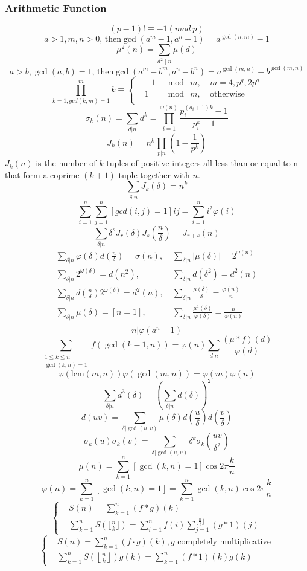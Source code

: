 \begin{footnotesize}
\subsubsection{Arithmetic Function}
\[(p-1)!\equiv-1(mod\ p)\]
\[a>1,m,n>0 \text{, then} \gcd(a^m-1,a^n-1)=a^{\gcd(n,m)}-1\]
\[ \mu^2(n) = \sum_{d^2 \mid n} \mu (d) \]
\[a>b,\gcd(a,b)=1 \text{, then} \gcd(a^m-b^m,a^n-b^n)=a^{\gcd(m,n)}-b^{\gcd(m,n)}\]
\[ \prod_{k=1,gcd(k, m) = 1}^{m} k \equiv \left\{
\begin{aligned}
&-1 & \mod\ m,\ & m = 4, p^q, 2p^q \\
&1 & \mod\ m,\ & \text{otherwise} \\
\end{aligned}
\right.
\]
\[ \sigma_k(n) = \sum_{d|n}d^k = \prod_{i=1}^{\omega(n)}\frac{p_i^{(a_i+1)k}-1}
{p_i^k-1} \]
\[ J_k(n) = n^k\prod_{p|n}(1-\frac{1}{p^k}) \]
$J_k(n)$ is the number of $k$-tuples of positive integers all less than or equal to n that form a coprime $(k + 1)$-tuple together with $n$.
\[ \sum_{\delta|n}J_k(\delta) = n^k \]
\[ \sum_{i=1}^{n} \sum_{j=1}^{n} [gcd(i,j)=1]ij =  \sum_{i=1}^{n} i^2\varphi(i) \]
\[ \sum_{\delta|n}\delta^sJ_r(\delta)J_s(\frac{n}{\delta}) = J_{r+s}(n) \]
\begin{align*}
\sum_{\delta|n}\varphi(\delta)d\left(\frac{n}{\delta}\right) = \sigma(n),&\ \sum_{\delta|n}\left| \mu(\delta) \right| = 2^{\omega(n)} \\
\sum_{\delta|n}2^{\omega(\delta)} = d(n^2),&\ \sum_{\delta|n}d(\delta^2) = d^2(n) \\
\sum_{\delta|n}d\left(\frac{n}{\delta}\right)2^{\omega(\delta)} = d^2(n),&\ \sum_{\delta|n}\frac{\mu(\delta)}{\delta} = \frac{\varphi(n)}{n} \\
\sum_{\delta|n}\mu(\delta) = [n=1],&\ \sum_{\delta|n}\frac{\mu^2(\delta)}{\varphi(\delta)} = \frac{n}{\varphi(n)} \\
\end{align*}
\[ n|\varphi(a^n-1) \]
\[ \sum_{\substack{1 \leq k \leq n \\ \gcd(k, n) = 1}}f(\gcd(k-1, n)) = \varphi(n)
\sum_{d|n}\frac{(\mu*f)(d)}{\varphi(d)} \]
\[ \varphi(\mathrm{lcm}(m, n))\varphi(\gcd(m,n)) = \varphi(m)\varphi(n) \]
\[ \sum_{\delta|n}d^3(\delta) = (\sum_{\delta|n}d(\delta))^2 \]
\[ d(uv) = \sum_{\delta|\gcd(u, v)}\mu(\delta)d(\frac{u}{\delta})d(\frac{v}{\delta}) \]
\[ \sigma_k(u)\sigma_k(v) = \sum_{\delta|\gcd(u, v)}\delta^k\sigma_k(\frac{uv}{\delta^2}) \]
\[ \mu(n) = \sum_{k=1}^n[\gcd(k, n)=1]\cos{2\pi \frac{k}{n}} \]
\[ \varphi(n) = \sum_{k=1}^n[\gcd(k, n)=1] = \sum_{k=1}^n\gcd(k, n)\cos{2\pi \frac{k}{n}} \]
\[
\left\{
\begin{aligned}
&S(n) = \sum_{k=1}^n(f \ast g)(k) \\
&\sum_{k=1}^nS(\lfloor \frac n k \rfloor) = \sum_{i=1}^nf(i)\sum_{j=1}^{\lfloor \frac n i \rfloor}(g \ast 1)(j)
\end{aligned}
\right.
\]
\[
\left\{
\begin{aligned}
&S(n) = \sum_{k=1}^n(f \cdot g)(k), g \text{ completely multiplicative} \\
&\sum_{k=1}^nS\left(\left\lfloor \frac n k \right\rfloor\right)g(k) = \sum_{k=1}^n(f \ast 1)(k)g(k)
\end{aligned}
\right.
\]

\end{footnotesize}

